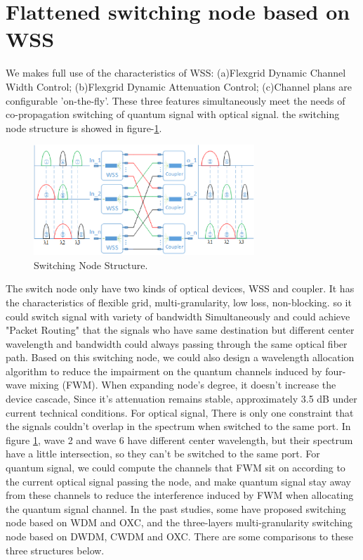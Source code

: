 \documentclass[letterpaper,10pt]{article}
\begin{document}
\section{Flattened switching node based on WSS}
We makes full use of the characteristics of WSS: (a)Flexgrid Dynamic Channel Width Control; (b)Flexgrid Dynamic Attenuation Control; (c)Channel plans are configurable 'on-the-fly'. These three features simultaneously meet the needs of co-propagation switching of quantum signal with optical signal. the switching node structure is showed in figure-\ref{fig:switching_node_structure}.
\begin{figure}[htbp]
  \centering
  \includegraphics[width=8.3cm]{swtiching_node_struct}
  \caption{Switching Node Structure.} \label{fig:switching_node_structure}
\end{figure}
The switch node only have two kinds of optical devices, WSS and coupler. It has the characteristics of flexible grid, multi-granularity, low loss, non-blocking. so it could switch signal with variety of bandwidth Simultaneously and could achieve "Packet Routing" that the signals who have same destination but different center wavelength and bandwidth could always passing through the same optical fiber path. Based on this switching node, we could also design a wavelength allocation algorithm to reduce the impairment on the quantum channels induced by four-wave mixing (FWM). When expanding node's degree, it doesn't increase the device cascade, Since it's attenuation remains stable, approximately 3.5 dB under current technical conditions.
For optical signal, There is only one constraint that the signals couldn't overlap in the spectrum when switched to the same port. In figure \ref{fig:switching_node_structure}, wave 2 and wave 6 have different center wavelength, but their spectrum have a little intersection, so they can't be switched to the same port. For quantum signal, we could compute the channels that FWM sit on according to the current optical signal passing the node, and make quantum signal stay away from these channels to reduce the interference induced by FWM when allocating the quantum signal channel. In the past studies, some have proposed switching node based on WDM and OXC, and the three-layers multi-granularity switching node based on DWDM, CWDM and OXC. There are some comparisons to these three structures below.
\end{document}
